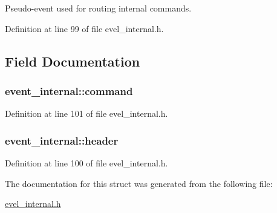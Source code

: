 Pseudo-\/event used for routing internal commands. 

Definition at line 99 of file evel\+\_\+internal.\+h.



\subsection{Field Documentation}
\hypertarget{structevent__internal_a7aabad85d349fa4a2d8cefe380fca9de}{}
\subsubsection[{command}]{ event\+\_\+internal\+::command}\label{structevent__internal_a7aabad85d349fa4a2d8cefe380fca9de}


Definition at line 101 of file evel\+\_\+internal.\+h.

\hypertarget{structevent__internal_a9bc97bfd3fc7deffd3df855e7e814645}{}
\subsubsection[{header}]{ event\+\_\+internal\+::header}\label{structevent__internal_a9bc97bfd3fc7deffd3df855e7e814645}


Definition at line 100 of file evel\+\_\+internal.\+h.



The documentation for this struct was generated from the following file\+:\begin{DoxyCompactItemize}
\item 
\hyperlink{evel__internal_8h}{evel\+\_\+internal.\+h}\end{DoxyCompactItemize}
